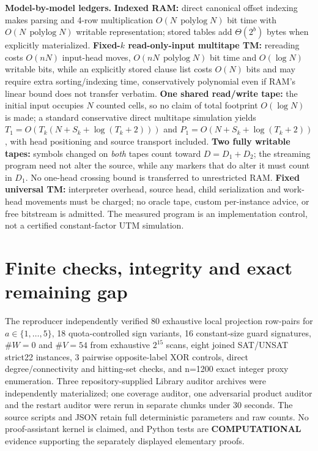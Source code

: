 \documentclass[10pt]{article}
\begin{document}
\noindent\textbf{Model-by-model ledgers.} \textbf{Indexed RAM:} direct canonical offset indexing makes parsing and 4-row multiplication $O(N\,\operatorname{polylog}N)$ bit time with $O(N\,\operatorname{polylog}N)$ writable representation; stored tables add $\Theta(2^b)$ bytes when explicitly materialized. \textbf{Fixed-$k$ read-only-input multitape TM:} rereading costs $O(nN)$ input-head moves, $O(nN\,\operatorname{polylog}N)$ bit time and $O(\log N)$ writable bits, while an explicitly stored clause list costs $O(N)$ bits and may require extra sorting/indexing time, conservatively polynomial even if RAM's linear bound does not transfer verbatim. \textbf{One shared read/write tape:} the initial input occupies $N$ counted cells, so no claim of total footprint $O(\log N)$ is made; a standard conservative direct multitape simulation yields $T_1=O(T_k(N+S_k+\log(T_k+2)))$ and $P_1=O(N+S_k+\log(T_k+2))$, with head positioning and source transport included. \textbf{Two fully writable tapes:} symbols changed on \emph{both} tapes count toward $D=D_1+D_2$; the streaming program need not alter the source, while any markers that do alter it must count in $D_1$. No one-head crossing bound is transferred to unrestricted RAM. \textbf{Fixed universal TM:} interpreter overhead, source head, child serialization and work-head movements must be charged; no oracle tape, custom per-instance advice, or free bitstream is admitted. The measured program is an implementation control, not a certified constant-factor UTM simulation.

\section{Finite checks, integrity and exact remaining gap}
The reproducer independently verified 80 exhaustive local projection row-pairs for $a\in\{1,\ldots,5\}$, 18 quota-controlled sign variants, 16 constant-size guard signatures, $\#W=0$ and $\#V=54$ from exhaustive $2^{15}$ scans, eight joined SAT/UNSAT strict22 instances, 3 pairwise opposite-label XOR controls, direct degree/connectivity and hitting-set checks, and n=1200 exact integer proxy enumeration. Three repository-supplied Library auditor archives were independently materialized; one coverage auditor, one adversarial product auditor and the restart auditor were rerun in separate chunks under 30 seconds. The source scripts and JSON retain full deterministic parameters and raw counts. No proof-assistant kernel is claimed, and Python tests are \textbf{COMPUTATIONAL} evidence supporting the separately displayed elementary proofs.
\end{document}
